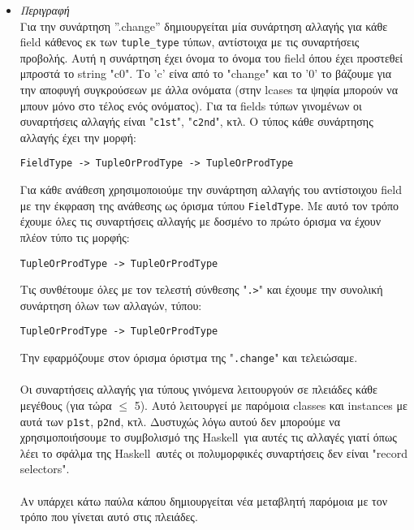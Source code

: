 \documentclass[diploma]{softlab-thesis}
\def\H{Haskell}
\begin{document}
\begin{itemize}
\begin{itemize}
\item
\textit{Περιγραφή}\\

Για την συνάρτηση ”.change” δημιουργείται μία συνάρτηση αλλαγής για κάθε field
κάθενος εκ των \verb|tuple_type| τύπων, αντίστοιχα με τις συναρτήσεις προβολής.
Αυτή η συνάρτηση έχει όνομα το όνομα του field όπου έχει προστεθεί μπροστά το
string "c0". Το 'c' είνα από το "change" και το '0' το βάζουμε για την αποφυγή
συγκρούσεων με άλλα ονόματα (στην lcases τα ψηφία μπορούν να μπουν μόνο στο
τέλος ενός ονόματος). Για τα fields τύπων γινομένων οι συναρτήσεις αλλαγής
είναι "\texttt{c1st}", "\texttt{c2nd}", κτλ. Ο τύπος κάθε συνάρτησης αλλαγής
έχει την μορφή:
\begin{verbatim}
FieldType -> TupleOrProdType -> TupleOrProdType
\end{verbatim}

Για κάθε ανάθεση χρησιμοποιούμε την συνάρτηση αλλαγής του αντίστοιχου field
με την έκφραση της ανάθεσης ως όρισμα τύπου \texttt{FieldType}.
Με αυτό τον τρόπο έχουμε όλες τις συναρτήσεις αλλαγής με δοσμένο το πρώτο
όρισμα να έχουν πλέον τύπο τις μορφής:
\begin{verbatim}
TupleOrProdType -> TupleOrProdType
\end{verbatim}

Τις συνθέτουμε όλες με τον τελεστή σύνθεσης "\texttt{.>}" και έχουμε την
συνολική συνάρτηση όλων των αλλαγών, τύπου:
\begin{verbatim}
TupleOrProdType -> TupleOrProdType
\end{verbatim}

Την εφαρμόζουμε στον όρισμα όριστμα της "\texttt{.change}" και τελειώσαμε.
\\\\
Οι συναρτήσεις αλλαγής για τύπους γινόμενα λειτουργούν σε πλειάδες κάθε
μεγέθους (για τώρα $\leq$ 5). Αυτό λειτουργεί με παρόμοια classes και
instances με αυτά των \texttt{p1st}, \texttt{p2nd}, κτλ. Δυστυχώς λόγω αυτού
δεν μπορούμε να χρησιμοποιήσουμε το συμβολισμό της \H\ για αυτές τις αλλαγές
γιατί όπως λέει το σφάλμα της \H\ αυτές οι πολυμορφικές συναρτήσεις
δεν είναι "record selectors".
\\\\
Αν υπάρχει κάτω παύλα κάπου δημιουργείται νέα μεταβλητή παρόμοια με τον τρόπο
που γίνεται αυτό στις πλειάδες.

\end{itemize}

\end{itemize}
\end{document}
